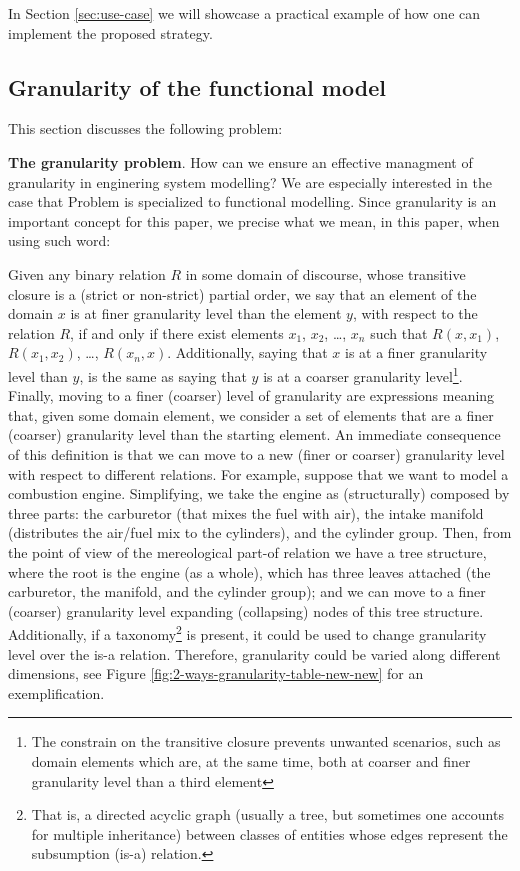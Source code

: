 \documentclass[
]{ceurart}
\begin{document}
In Section \ref{sec:use-case} we will showcase a practical example of how one can implement the proposed strategy.  

\subsection{Granularity of the functional model}
This section discusses the following problem:
\bflist
  \item[\mypb{granularity-problem}] \textbf{The granularity problem}. How can we ensure an effective managment of granularity in enginering system modelling?
\eflist
We are especially interested in the case that Problem  is specialized to functional modelling.
Since granularity is an important concept for this paper, we precise what we mean, in this paper, when using such word:
\bflist
\item[\mydf{granularity}]
    Given any binary relation $R$ in some domain of discourse, whose transitive closure is a (strict or non-strict) partial order, we say that an element of the domain $x$ is at finer granularity level than the element $y$, with respect to the relation $R$, if and only if there exist elements $x_1$, $x_2$, \dots, $x_n$ such that $R(x,x_1)$, $R(x_1,x_2)$, \dots, $R(x_n,x)$. 
    Additionally, saying that $x$ is at a finer granularity level than $y$, is the same as saying that $y$ is at a coarser granularity level\footnote{The constrain on the transitive closure prevents unwanted scenarios, such as domain elements which are, at the same time, both at coarser and finer granularity level than a third element}.
    Finally, moving to a finer (coarser) level of granularity are expressions meaning that, given some domain element, we consider a set of elements that are a finer (coarser) granularity level than the starting element.%
\eflist
An immediate consequence of this definition is that we can move to a new (finer or coarser) granularity level with respect to different relations. For example, suppose that we want to model a combustion engine. Simplifying, we take the engine as (structurally) composed by three parts: the carburetor (that mixes the fuel with air), the intake manifold (distributes the air/fuel mix to the cylinders), and the cylinder group. Then, from the point of view of the mereological part-of relation we have a tree structure, where the root is the engine (as a whole), which has three leaves attached (the carburetor, the manifold, and the cylinder group); and we can move to a finer (coarser) granularity level expanding (collapsing) nodes of this tree structure. Additionally, if a taxonomy\footnote{That is, a directed acyclic graph (usually a tree, but sometimes one accounts for multiple inheritance) between classes of entities whose edges represent the subsumption (is-a) relation.} is present, it could be used to change granularity level over the is-a relation. Therefore, granularity could be varied along different dimensions, see Figure \ref{fig:2-ways-granularity-table-new-new} for an exemplification. 
\end{document}
